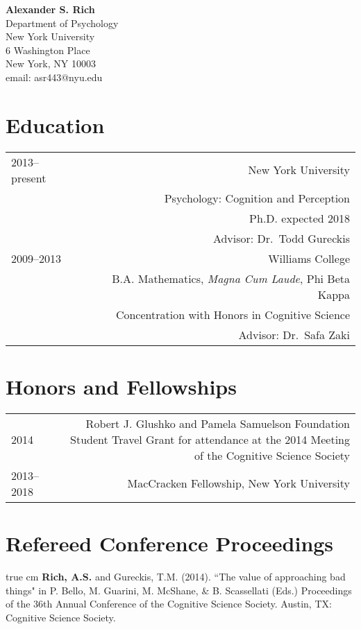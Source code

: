 \documentclass[12pt]{my_cv}
\def\ind{\hangindent=1 true cm\hangafter=1 \noindent}
\begin{document}
\noindent \textbf{\sffamily\Large Alexander S. Rich}\vspace{1em}\\
Department of Psychology\\
New York University\\
6 Washington Place\\
 New York, NY 10003\\
email: asr443@nyu.edu\\

\section{Education}
\begin{tabular}{L R}
2013--present&New York University\\
&Psychology: Cognition and Perception\\
&Ph.D. expected 2018\\
&Advisor: Dr.\ Todd Gureckis \vspace{1em}\\ 
2009--2013&Williams College\\
&B.A. Mathematics, \emph{Magna Cum Laude}, Phi Beta Kappa\\
&Concentration with Honors in Cognitive Science\\
&Advisor: Dr.\ Safa Zaki\\
\end{tabular}

\section{Honors and Fellowships}
\begin{tabular}{L R}
2014&Robert J. Glushko and Pamela Samuelson Foundation Student Travel Grant for attendance at the 2014 Meeting of the Cognitive Science Society\\[1ex]
2013--2018&MacCracken Fellowship, New York University\\
\end{tabular}

\section{Refereed Conference Proceedings}
\ind \textbf{Rich, A.S.} and Gureckis, T.M. (2014). ``The value of approaching bad things" in P. Bello, M. Guarini, M. McShane, \& B. Scassellati (Eds.) Proceedings of the 36th Annual Conference of the Cognitive Science Society. Austin, TX: Cognitive Science Society.	
\end{document}
